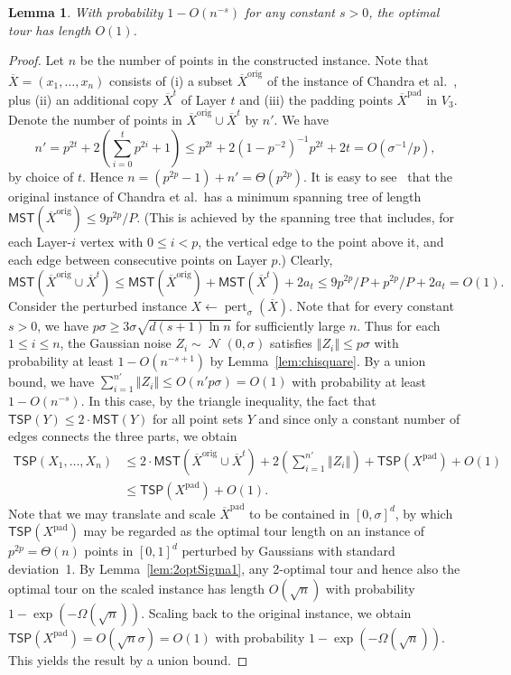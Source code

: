 \documentclass[11pt,DIV=12,a4paper]{scrartcl}
\newtheorem{lemma}[claim]{Lemma}
\newcommand{\todo}[1]{\fbox{\bfseries\boldmath TODO: #1}}
\newcommand{\pad}{\mathrm{pad}}
\newcommand{\norm}[1]{\left\Vert #1 \right\Vert}
\newcommand{\TSP}{\mathsf{TSP}}
\DeclareMathOperator{\Gauss}{\mathcal{N}}
\DeclareMathOperator{\pert}{pert}
\newcommand{\orig}{\mathrm{orig}}
\newcommand{\MST}{\mathsf{MST}}
\begin{document}
\begin{lemma}\label{lem:optOnInstance}
With probability $1-O(n^{-s})$ for any constant $s>0$, the optimal tour has length $O(1)$.
\end{lemma}
\begin{proof}%
Let $n$ be the number of points in the constructed instance. Note that $\overline{X} = (x_1,\dots,x_n)$ consists of (i) a subset $\overline{X}^\orig$ of the instance of Chandra et al.~\cite{ChandraEA:OldOpt:1999}, plus (ii) an additional copy $\overline{X}^t$ of Layer $t$ and (iii) the padding points $\overline{X}^\pad$ in $V_3$. Denote the number of points in $\overline{X}^\orig \cup \overline{X}^t$ by $n'$. We have
\[ n' = p^{2t} + 2\left(\sum_{i=0}^t p^{2i} + 1\right) \le p^{2t} + 2(1-p^{-2})^{-1}p^{2t} + 2t = O(\sigma^{-1}/p),  \]
by choice of $t$. Hence $n= (p^{2p}-1) + n' = \Theta(p^{2p})$.  It is easy to see~\cite{ChandraEA:OldOpt:1999} that the original instance of Chandra et al.~has a minimum spanning tree of length
$\MST(\overline{X}^\orig) \le 9p^{2p}/P$. (This is achieved by the spanning tree that includes, for each Layer-$i$ vertex with $0\le i< p$, the vertical edge to the point above it, and each edge between consecutive points on Layer $p$.)
Clearly,
\[
\MST(\overline{X}^\orig \cup \overline{X}^t) \le \MST(\overline{X}^\orig) + \MST(\overline{X}^t) + 2a_t \le 9p^{2p}/P + p^{2p}/P + 2a_t= O(1).
\]
Consider the perturbed instance $X \leftarrow \pert_\sigma(\overline X)$. 
Note that for every constant $s>0$, we have $p\sigma \ge 3\sigma \sqrt{d(s+1)\ln n}$ for sufficiently large $n$. Thus for each $1\le i \le n$, the Gaussian noise $Z_i \sim \Gauss(0,\sigma)$ satisfies $\norm{Z_i} \le p\sigma$ with probability at least $1-O(n^{-s+1})$ by Lemma~\ref{lem:chisquare}. By a union bound, we have $\sum_{i=1}^{n'} \norm{Z_i} \le O(n'p\sigma)=O(1)$ with probability at least $1-O(n^{-s})$. In this case, by the triangle inequality, the fact that $\TSP(Y) \le 2\cdot \MST(Y)$ for all point sets $Y$ and since only a constant number of edges connects the three parts, we obtain
\begin{align*}
\TSP(X_1,\dots,X_n) & \le  2\cdot \MST(\overline{X}^\orig \cup \overline{X}^t) + 2\left(\sum_{i=1}^{n'} \norm{Z_i}\right) + \TSP(X^\pad) + O(1)\\
 & \le  \TSP(X^\pad) + O(1).
\end{align*}
Note that we may translate and scale $\overline{X}^\pad$ to be contained in $[0,\sigma]^d$, by which $\TSP(X^\pad)$ may be regarded as the optimal tour length on an instance of $p^{2p} = \Theta(n)$ points in $[0,1]^d$ perturbed by Gaussians with standard deviation~1. By Lemma~\ref{lem:2optSigma1}, any 2-optimal tour and hence also the optimal tour on the scaled instance has length $O(\sqrt{n})$ with probability $1-\exp(-\Omega(\sqrt{n}))$. Scaling back to the original instance, we obtain $\TSP(X^\pad) = O(\sqrt{n}\sigma) = O(1)$ with probability $1-\exp(-\Omega(\sqrt{n}))$. This yields the result by a union bound.
\end{proof}
\end{document}
